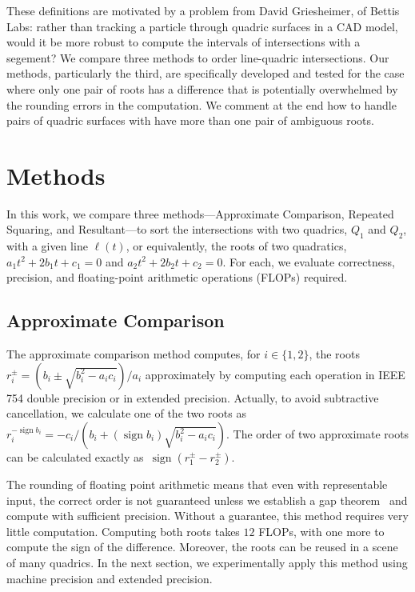 \documentclass{cccg16}
\DeclareMathOperator{\sign}{sign}
\begin{document}
These definitions are motivated by a problem from David Griesheimer, of Bettis Labs:  rather than tracking a particle through quadric surfaces in a CAD model, would it be more robust to compute the intervals of intersections with a segement?  
We compare three methods to order line-quadric intersections.
Our methods, particularly the third,  are specifically 
developed and tested for the case where only one pair of roots has a difference
that is potentially overwhelmed by the rounding errors in the
computation. We comment at the end how to handle pairs of quadric
surfaces with have more than one pair of ambiguous roots.

\section{Methods}
In this work, we compare three  methods---Approximate Comparison,
Repeated Squaring, and Resultant---to sort the intersections with two quadrics, $Q_1$ and $Q_2$, with a given line $\ell(t)$, or equivalently, the roots of two quadratics, $a_1t^2+2b_1t+c_1=0$ and $a_2t^2+2b_2t+c_2=0$.  
For each, we evaluate correctness, precision, and floating-point arithmetic operations (FLOPs) required.

\subsection{Approximate Comparison}
The approximate comparison method computes, for $i\in\{1, 2\}$, the
roots~$r_i^\pm=({b_i\pm\sqrt{b_i^2-a_ic_i}})/{a_i}$ approximately by
computing each operation in IEEE 754 double precision or in extended precision.  Actually, to avoid subtractive cancellation, we calculate one of the two roots as 
$r_i^{-\sign b_i}=-c_i/({b_i+(\sign{b_i})\sqrt{b_i^2-a_ic_i}})$.
The order of two approximate roots can be
calculated exactly as~$\sign(r_1^\pm-r_2^\pm)$.


The rounding of floating point arithmetic means that even with representable input, the correct order is not guaranteed unless we establish a gap theorem~\cite{Canny,EMT} and compute with sufficient precision.   
Without a guarantee,  this method
requires very little computation.  Computing both roots takes
$12$ FLOPs, with one more to compute the sign of the difference.   
Moreover, the roots can be reused in a scene of many quadrics.  
In the next section, we experimentally apply this method using machine precision and extended precision.
\end{document}
